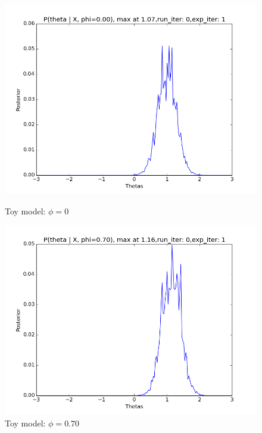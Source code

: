 \documentclass[10pt,journal,compsoc]{IEEEtran}
\begin{document}
\begin{figure}
\begin{minipage}[b]{0.5\linewidth}
\centering
\includegraphics[width=1\linewidth]{images/LP0.png} 
\caption{\label{fig:LP0}Toy model: $\phi=0$} 
\end{minipage}%
\begin{minipage}[b]{0.5\linewidth}
\centering
\includegraphics[width=1\linewidth]{images/LP1.png} 
\caption{\label{fig:LP1}Toy model: $\phi=0.70$}
\end{minipage} 
\begin{minipage}[b]{0.5\linewidth}
\centering

\end{minipage}
\end{figure}
\end{document}
